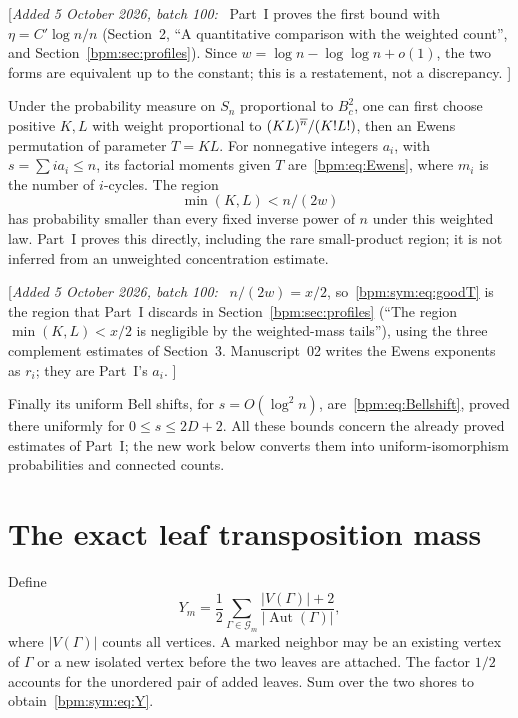 \documentclass[11pt,a4paper]{article}
\theoremstyle{remark}\newtheorem{remark}[theorem]{Remark}%
\newcommand{\Aut}{\operatorname{Aut}}\newcommand{\ee}{\mathrm e}
\newenvironment{writenote}{\par\smallskip\noindent\small[\textit{Added 5 October 2026, batch 100:}\ }{]\par\smallskip}
\begin{document}
\begin{writenote}
Part~I proves the first bound with $\eta=C'\log n/n$
(Section~2, ``A quantitative comparison with the weighted count'', and
Section~\ref{bpm:sec:profiles}). Since $w=\log n-\log\log n+o(1)$, the
two forms are equivalent up to the constant; this is a restatement, not a
discrepancy.
\end{writenote}

Under the probability measure on $S_n$ proportional to $B_c^2$, one can first choose positive $K,L$ with weight proportional to $(KL)^{\overline{n}}/(K!L!)$, then an Ewens permutation of parameter $T=KL$. For nonnegative integers $a_i$, with $s=\sum i a_i\le n$, its factorial moments given $T$ are~\eqref{bpm:eq:Ewens}, where $m_i$ is the number of $i$-cycles. The region
\begin{equation}\label{bpm:sym:eq:goodT}
 \min(K,L)<n/(2w)
\end{equation}
has probability smaller than every fixed inverse power of $n$ under this weighted law. Part~I proves this directly, including the rare small-product region; it is not inferred from an unweighted concentration estimate.

\begin{writenote}
$n/(2w)=x/2$, so~\eqref{bpm:sym:eq:goodT} is the region that Part~I
discards in Section~\ref{bpm:sec:profiles} (``The region $\min(K,L)<x/2$ is
negligible by the weighted-mass tails''), using the three complement
estimates of Section~3. Manuscript~02 writes the Ewens exponents as $r_i$;
they are Part~I's $a_i$.
\end{writenote}

Finally its uniform Bell shifts, for $s=O(\log^2 n)$, are~\eqref{bpm:eq:Bellshift}, proved there uniformly for $0\le s\le2D+2$. All these bounds concern the already proved estimates of Part~I; the new work below converts them into uniform-isomorphism probabilities and connected counts.

\section{The exact leaf transposition mass}
Define
\begin{equation}\label{bpm:sym:eq:Y}
 Y_m=\frac12\sum_{\Gamma\in\mathcal G_m}\frac{|V(\Gamma)|+2}{|\Aut(\Gamma)|},
\end{equation}
where $|V(\Gamma)|$ counts all vertices. A marked neighbor may be an existing vertex of $\Gamma$ or a new isolated vertex before the two leaves are attached. The factor $1/2$ accounts for the unordered pair of added leaves. Sum over the two shores to obtain~\eqref{bpm:sym:eq:Y}.
\end{document}
